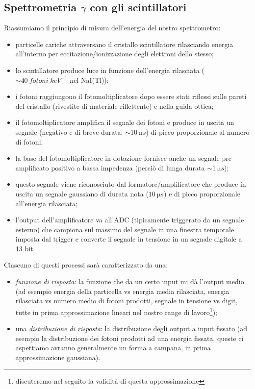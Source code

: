 \subsection{Spettrometria $\gamma$ con gli scintillatori}
Riassumiamo il principio di misura dell'energia del nostro spettrometro:
\begin{itemize}
	\item particelle cariche attraversano il cristallo scintillatore rilasciando energia all'interno per eccitazione/ionizzazione degli elettroni dello stesso;
	\item lo scintillatore produce luce in funzione dell'energia rilasciata ($\sim \SI{40}{fotoni \; keV^{-1}}$ nel NaI(Tl));
	\item i fotoni raggiungono il fotomoltiplicatore dopo essere stati riflessi sulle pareti del cristallo (rivestite di materiale riflettente) e nella guida ottica;
	\item il fotomoltiplicatore amplifica il segnale dei fotoni e produce in uscita un segnale (negativo e di breve durata: $\sim \SI{10}{\nano s}$) di picco proporzionale al numero di fotoni;
	\item la base del fotomoltiplicatore in dotazione fornisce anche un segnale pre-amplificato positivo a bassa impedenza (perciò di lunga durata $\sim \SI{1}{\micro s}$);
	\item questo segnale viene riconosciuto dal formatore/amplificatore che produce in uscita un segnale gaussiano di durata nota ($\SI{10}{\micro s}$) e di picco proporzionale all'energia rilasciata;
	\item l'output dell'amplificatore va all'ADC (tipicamente triggerato da un segnale esterno) che campiona sul massimo del segnale in una finestra temporale imposta dal trigger e converte il segnale in tensione in un segnale digitale a 13 bit.
\end{itemize}
Ciascuno di questi processi sarà caratterizzato da una:
\begin{itemize}
	\item\emph{funzione di risposta}: la funzione che da un certo input mi dà l'output medio (ad esempio energia della particella vs energia media rilasciata, energia rilasciata vs numero medio di fotoni prodotti, segnale in tensione vs digit, tutte in prima approssimazione lineari nel nostro range di lavoro\footnote{discuteremo nel seguito la validità di questa approssimazione});
    \item una \emph{distribuzione di risposta}: la distribuzione degli output a input fissato (ad esempio la distribuzione dei fotoni prodotti ad una energia fissata, queste ci aspettiamo avranno generalmente un forma a campana, in prima approssimazione gaussiana).
\end{itemize}

